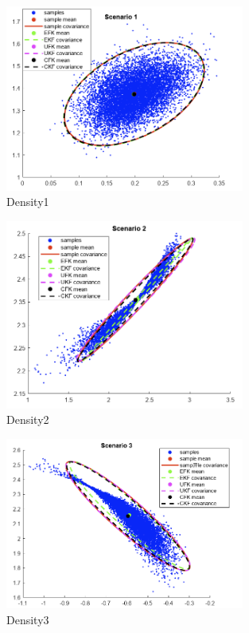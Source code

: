 \begin{figure}[H]
 \centering
 \includegraphics[width=0.7\textwidth]{images/scenario1.png}
 \caption{Density1}
 \label{s1}
\end{figure}
\begin{figure}[H]
 \centering
 \includegraphics[width=0.7\textwidth]{images/scenario2.png}
 \caption{Density2}
 \label{s2}
\end{figure}
\begin{figure}[H]
 \centering
 \includegraphics[width=0.7\textwidth]{images/scenario3.png}
 \caption{Density3}
 \label{s3}
\end{figure}

